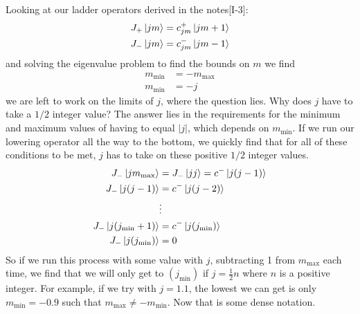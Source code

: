 \documentclass{jhwhw}
\begin{document}
Looking at our ladder operators derived in the notes[I-3]:
\begin{align}
	J_+ \ket{j m} &= c_{jm}^+ \ket{jm+1}
	\\
	J_- \ket{j m} &= c_{jm}^- \ket{jm-1}
\end{align}
and solving the eigenvalue problem to find the bounds on $m$ we find
\begin{align}
	m_\text{min} &= - m_\text{max}
	\\
	m_\text{min} &= -j
\end{align}
we are left to work on the limits of $j$, where the question lies.  Why does $j$ have to take a $1/2$ integer value?  The answer lies in the requirements for the minimum and maximum values of having to equal $|j|$, which depends on $m_\text{min}$.  If we run our lowering operator all the way to the bottom, we quickly find that for all of these conditions to be met, $j$ has to take on these positive $1/2$ integer values.
\begin{align}
	J_- \ket{j m_\text{max}} 
	&=
	J_- \ket{j j} 
	= 
	c^- \ket{j(j-1)}
	\\
	J_- \ket{j (j-1)} 
	&=
	c^- \ket{j(j-2)}
	\\
	&\vdots
	\\
	J_- \ket{j (j_\text{min}+1)} 
	&=
	c^- \ket{j(j_\text{min})}
	\\
	J_- \ket{j (j_\text{min})} 
	&=
	0
\end{align}
So if we run this process with some value with $j$, subtracting 1 from $m_\text{max}$ each time, we find that we will only get to $(j_\text{min})$ if $j = \frac{1}{2}n$ where $n$ is a positive integer.  For example, if we try with $j = 1.1$, the lowest we can get is only $m_\text{min} = -0.9$ such that $m_\text{max} \neq -m_\text{min}$.  Now that is some dense notation.
\end{document}
